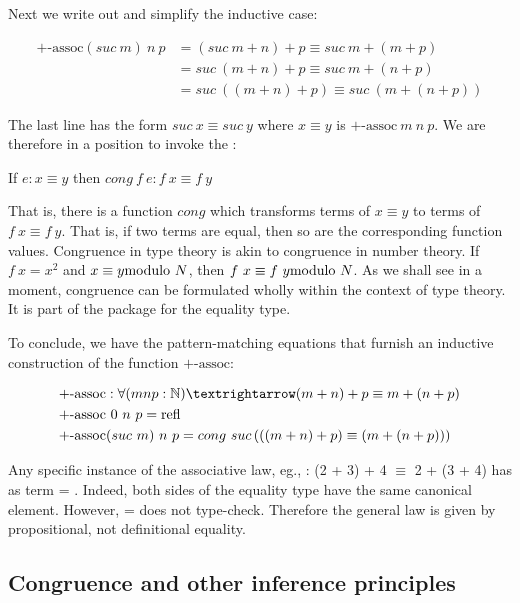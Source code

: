 Next we write out and simplify the inductive case:

\begin{align}
\label{pencil:paper}
\text{+-assoc} (suc\ m)\ n\ p &= (suc\ m + n) + p \equiv suc\ m + (m + p) \\
&= suc\ (m + n) + p \equiv suc\ m + (n + p) \\
&= suc\ ((m + n) + p) \equiv suc\ (m + (n + p))
\end{align}

The last line has the form $suc\ x \equiv suc\ y$ where $x \equiv y$ is $\text{+-assoc}\ m\ n\ p$.  We are therefore in a position to invoke the : 

\begin{indent}
If $e : x \equiv y$ then $cong\ f\ e: f\ x \equiv f\ y$
\end{indent}

That is, there is a function $cong$ which transforms terms of $x \equiv y$ to terms of $f\ x \equiv f\ y$.  That is, if two terms are equal, then so are the corresponding function values.  Congruence in type theory is akin to congruence in number theory.  If $f\ x = x^2$ and
$x \equiv y\space \text{modulo}\ N$, then  $f\ x \equiv f\ y\space \text{modulo}\ N$.
As we shall see in a moment, congruence can be formulated wholly within the context of type theory.  It is part of the package for the equality type.

To conclude, we have the pattern-matching equations that furnish an inductive construction of the function $\text{+-assoc} $:

\begin{align}
& \text{+-assoc} : \forall (m\space n\space p : \bbN) → (m + n) + p \equiv m + (n + p) \\
& \text{+-assoc}\ 0\ n\ p = \refl \\
& \text{+-assoc} (suc\ m)\ n\ p = cong\ suc \left(((m + n) + p) \equiv (m + (n + p)) \right)  \\
\end{align}



Any specific instance of the associative law, eg., : (2 + 3) + 4 $\equiv$ 2 + (3 + 4)   has as term  = . Indeed, both sides of the equality type have the same canonical element.   However,  =  does not type-check.  Therefore the general law is given by propositional, not definitional equality.

\subsection{Congruence and other inference principles}


